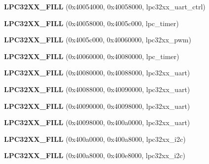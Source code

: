 \begin{DoxyCompactItemize}
{\bfseries L\+P\+C32\+X\+X\+\_\+\+F\+I\+LL} (0x40054000, 0x40058000, lpc32xx\+\_\+uart\+\_\+ctrl)
\item 
\mbox{\label{structlpc32xx__registers_a1d1b9c71e8554e1ae704a0c093757709}} 
{\bfseries L\+P\+C32\+X\+X\+\_\+\+F\+I\+LL} (0x40058000, 0x4005c000, lpc\+\_\+timer)
\item 
\mbox{\label{structlpc32xx__registers_a754eef2c34ba35da5529aadb253b45c6}} 
{\bfseries L\+P\+C32\+X\+X\+\_\+\+F\+I\+LL} (0x4005c000, 0x40060000, lpc32xx\+\_\+pwm)
\item 
\mbox{\label{structlpc32xx__registers_afd4581cb5901e4c2825c6853c23041bb}} 
{\bfseries L\+P\+C32\+X\+X\+\_\+\+F\+I\+LL} (0x40060000, 0x40080000, lpc\+\_\+timer)
\item 
\mbox{\label{structlpc32xx__registers_a883f7efc843f349b3d8249f1006f5d41}} 
{\bfseries L\+P\+C32\+X\+X\+\_\+\+F\+I\+LL} (0x40080000, 0x40088000, lpc32xx\+\_\+uart)
\item 
\mbox{\label{structlpc32xx__registers_afff64a6d86d250e2e94af1ca46a4c4ca}} 
{\bfseries L\+P\+C32\+X\+X\+\_\+\+F\+I\+LL} (0x40088000, 0x40090000, lpc32xx\+\_\+uart)
\item 
\mbox{\label{structlpc32xx__registers_adde66a5bdf447b3c5a2bc63a4535035b}} 
{\bfseries L\+P\+C32\+X\+X\+\_\+\+F\+I\+LL} (0x40090000, 0x40098000, lpc32xx\+\_\+uart)
\item 
\mbox{\label{structlpc32xx__registers_acb7f8225321cc7a901bfbc9625473278}} 
{\bfseries L\+P\+C32\+X\+X\+\_\+\+F\+I\+LL} (0x40098000, 0x400a0000, lpc32xx\+\_\+uart)
\item 
\mbox{\label{structlpc32xx__registers_ab88cb77ec5be3c86c2c52fc51333b6db}} 
{\bfseries L\+P\+C32\+X\+X\+\_\+\+F\+I\+LL} (0x400a0000, 0x400a8000, lpc32xx\+\_\+i2c)
\item 
\mbox{\label{structlpc32xx__registers_a2a0615a7f9bd5b178c0c1d6e582bc943}} 
{\bfseries L\+P\+C32\+X\+X\+\_\+\+F\+I\+LL} (0x400a8000, 0x400e8000, lpc32xx\+\_\+i2c)
\end{DoxyCompactItemize}
